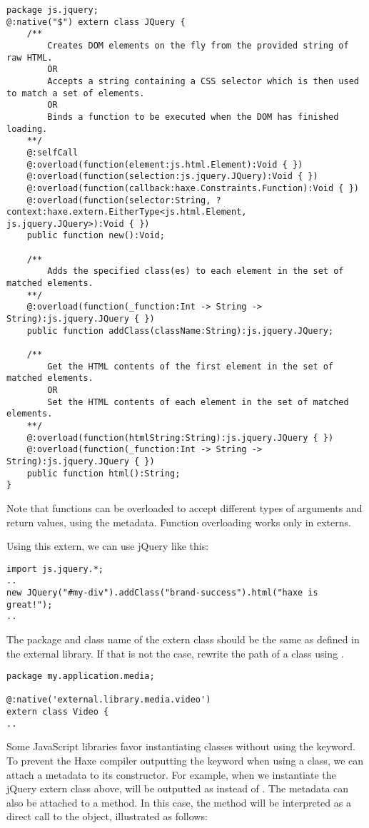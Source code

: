 \begin{lstlisting}
package js.jquery;
@:native("$") extern class JQuery {
	/**
		Creates DOM elements on the fly from the provided string of raw HTML.
		OR
		Accepts a string containing a CSS selector which is then used to match a set of elements.
		OR
		Binds a function to be executed when the DOM has finished loading.
	**/
	@:selfCall
	@:overload(function(element:js.html.Element):Void { })
	@:overload(function(selection:js.jquery.JQuery):Void { })
	@:overload(function(callback:haxe.Constraints.Function):Void { })
	@:overload(function(selector:String, ?context:haxe.extern.EitherType<js.html.Element, js.jquery.JQuery>):Void { })
	public function new():Void;

	/**
		Adds the specified class(es) to each element in the set of matched elements.
	**/
	@:overload(function(_function:Int -> String -> String):js.jquery.JQuery { })
	public function addClass(className:String):js.jquery.JQuery;

	/**
		Get the HTML contents of the first element in the set of matched elements.
		OR
		Set the HTML contents of each element in the set of matched elements.
	**/
	@:overload(function(htmlString:String):js.jquery.JQuery { })
	@:overload(function(_function:Int -> String -> String):js.jquery.JQuery { })
	public function html():String;
}
\end{lstlisting}

Note that functions can be overloaded to accept different types of arguments and return values, using the  metadata. Function overloading works only in externs.

Using this extern, we can use jQuery like this:

\begin{lstlisting}
import js.jquery.*;
..
new JQuery("#my-div").addClass("brand-success").html("haxe is great!");
..
\end{lstlisting}

The package and class name of the extern class should be the same as defined in the external library. If that is not the case, rewrite the path of a class using .

\begin{lstlisting}
package my.application.media;

@:native('external.library.media.video')
extern class Video {
..
\end{lstlisting}

Some JavaScript libraries favor instantiating classes without using the  keyword. To prevent the Haxe compiler outputting the  keyword when using a class, we can attach a  metadata to its constructor. For example, when we instantiate the jQuery extern class above,  will be outputted as \expr{\$()} instead of . The  metadata can also be attached to a method. In this case, the method will be interpreted as a direct call to the object, illustrated as follows:

